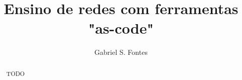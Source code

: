 \documentclass[12pt]{article}
\title{Ensino de redes com ferramentas "as-code"}
\author{Gabriel S. Fontes\inst{1}}
\begin{document}
\maketitle

\begin{abstract}
    TODO
\end{abstract}



\end{document}

